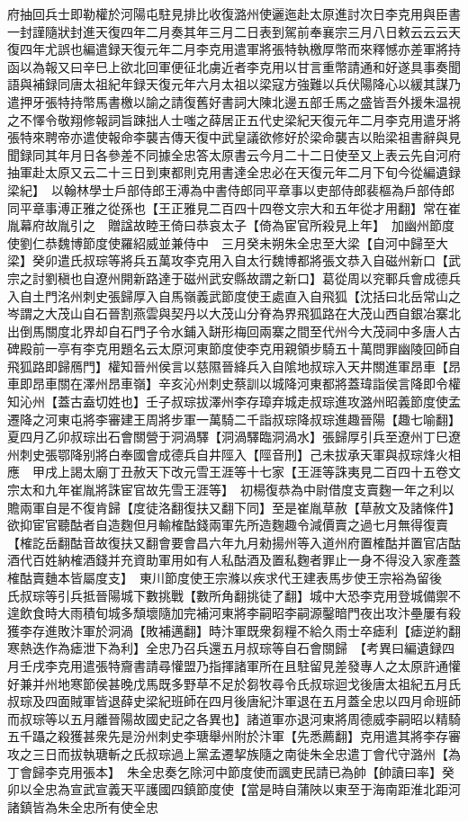 府抽回兵士即勒權於河陽屯駐見排比收復潞州使邐迤赴太原進討次日李克用與臣書一封謹隨狀封進天復四年二月奏其年三月二日表到駕前奉襄宗三月八日敕云云云天復四年尤誤也編遣録天復元年二月李克用遣軍將張特執檄厚幣而來釋憾亦差軍將持函以為報又曰辛巳上欲北回軍便征北虜近者李克用以甘言重幣請通和好遂具事奏聞語與補録同唐太祖紀年録天復元年六月太祖以梁寇方強難以兵伏陽降心以緩其謀乃遣押牙張特持幣馬書檄以諭之請復舊好書詞大陳北邊五部壬馬之盛皆吾外援朱温視之不懌令敬翔修報詞旨踈拙人士嗤之薛居正五代史梁紀天復元年二月李克用遣牙將張特來聘帝亦遣使報命李襲吉傳天復中武皇議欲修好於梁命襲吉以貽梁祖書辭與見聞録同其年月日各參差不同據全忠答太原書云今月二十二日使至又上表云先自河府抽軍赴太原又云二十三日到東都則克用書達全忠必在天復元年二月下旬今從編遺録梁紀】　以翰林學士戶部侍郎王溥為中書侍郎同平章事以吏部侍郎裴樞為戶部侍郎同平章事溥正雅之從孫也【王正雅見二百四十四卷文宗大和五年從才用翻】常在崔胤幕府故胤引之　贈諡故睦王倚曰恭哀太子【倚為宦官所殺見上年】　加幽州節度使劉仁恭魏博節度使羅紹威並兼侍中　三月癸未朔朱全忠至大梁【自河中歸至大梁】癸卯遣氏叔琮等將兵五萬攻李克用入自太行魏博都將張文恭入自磁州新口【武宗之討劉稹也自遼州開新路達于磁州武安縣故謂之新口】葛從周以兖鄆兵會成德兵入自土門洺州刺史張歸厚入自馬嶺義武節度使王處直入自飛狐【沈括曰北岳常山之岑謂之大茂山自石晉割燕雲與契丹以大茂山分脊為界飛狐路在大茂山西自銀冶寨北出倒馬關度北界却自石門子令水鋪入缾形梅回兩寨之間至代州今大茂祠中多唐人古碑殿前一亭有李克用題名云太原河東節度使李克用親領步騎五十萬問罪幽陵回師自飛狐路即歸鴈門】權知晉州侯言以慈隰晉絳兵入自隂地叔琮入天井關進軍昂車【昂車即昂車關在澤州昂車嶺】辛亥沁州刺史蔡訓以城降河東都將蓋瑋詣侯言降即令權知沁州【蓋古盍切姓也】壬子叔琮拔澤州李存璋弃城走叔琮進攻潞州昭義節度使孟遷降之河東屯將李審建王周將步軍一萬騎二千詣叔琮降叔琮進趣晉陽【趣七喻翻】夏四月乙卯叔琮出石會關營于洞渦驛【洞渦驛臨洞渦水】張歸厚引兵至遼州丁巳遼州刺史張鄂降别將白奉國會成德兵自井陘入【陘音刑】己未拔承天軍與叔琮烽火相應　甲戌上謁太廟丁丑赦天下改元雪王涯等十七家【王涯等誅夷見二百四十五卷文宗太和九年崔胤將誅宦官故先雪王涯等】　初楊復恭為中尉借度支賣麴一年之利以贍兩軍自是不復肯歸【度徒洛翻復扶又翻下同】至是崔胤草赦【草赦文及諸條件】欲抑宦官聽酤者自造麴但月輸榷酤錢兩軍先所造麴趣令減價賣之過七月無得復賣【榷訖岳翻酤音故復扶又翻會要會昌六年九月勑揚州等入道州府置榷酤并置官店酤酒代百姓納榷酒錢并充資助軍用如有人私酤酒及置私麴者罪止一身不得没入家產蓋榷酤賣麯本皆屬度支】　東川節度使王宗滌以疾求代王建表馬步使王宗裕為留後　氏叔琮等引兵抵晉陽城下數挑戰【數所角翻挑徒了翻】城中大恐李克用登城備禦不遑飲食時大雨積旬城多頹壞隨加完補河東將李嗣昭李嗣源鑿暗門夜出攻汴壘屢有殺獲李存進敗汴軍於洞渦【敗補邁翻】時汴軍既衆芻糧不給久雨士卒瘧利【瘧逆約翻寒熱迭作為瘧泄下為利】全忠乃召兵還五月叔琮等自石會關歸　【考異曰編遺録四月壬戌李克用遣張特齎書請尋懽盟乃指揮諸軍所在且駐留見差發專人之太原許通懽好兼并州地寒節侯甚晚戊馬既多野草不足於芻牧尋令氏叔琮迴戈後唐太祖紀五月氏叔琮及四面賊軍皆退薛史梁紀班師在四月後唐紀汴軍退在五月蓋全忠以四月命班師而叔琮等以五月離晉陽故國史記之各異也】諸道軍亦退河東將周德威李嗣昭以精騎五千躡之殺獲甚衆先是汾州刺史李瑭舉州附於汴軍【先悉薦翻】克用遣其將李存審攻之三日而拔執瑭斬之氏叔琮過上黨孟遷挈族隨之南徙朱全忠遣丁會代守潞州【為丁會歸李克用張本】　朱全忠奏乞除河中節度使而諷吏民請已為帥【帥讀曰率】癸卯以全忠為宣武宣義天平護國四鎮節度使【當是時自蒲陜以東至于海南距淮北距河諸鎮皆為朱全忠所有使全忠